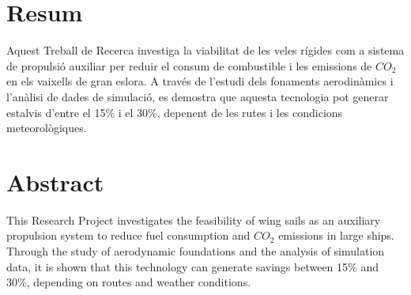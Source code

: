 \chapter*{Resum}

Aquest Treball de Recerca investiga la viabilitat de les veles rígides com a sistema de propulsió auxiliar per reduir el consum de combustible i les emissions de $CO_2$ en els vaixells de gran eslora. A través de l'estudi dels fonaments aerodinàmics i l'anàlisi de dades de simulació, es demostra que aquesta tecnologia pot generar estalvis d'entre el 15\% i el 30\%, depenent de les rutes i les condicions meteorològiques.

\vspace{1cm}

\chapter*{Abstract}

This Research Project investigates the feasibility of wing sails as an auxiliary propulsion system to reduce fuel consumption and $CO_2$ emissions in large ships. Through the study of aerodynamic foundations and the analysis of simulation data, it is shown that this technology can generate savings between 15\% and 30\%, depending on routes and weather conditions.
